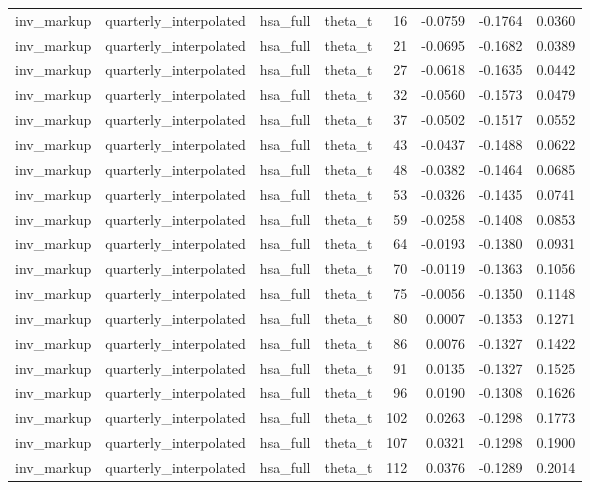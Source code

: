 \begin{tabular}{llllrrrr}
inv\_markup & quarterly\_interpolated & hsa\_full & theta\_t & 16 & -0.0759 & -0.1764 & 0.0360 \\
inv\_markup & quarterly\_interpolated & hsa\_full & theta\_t & 21 & -0.0695 & -0.1682 & 0.0389 \\
inv\_markup & quarterly\_interpolated & hsa\_full & theta\_t & 27 & -0.0618 & -0.1635 & 0.0442 \\
inv\_markup & quarterly\_interpolated & hsa\_full & theta\_t & 32 & -0.0560 & -0.1573 & 0.0479 \\
inv\_markup & quarterly\_interpolated & hsa\_full & theta\_t & 37 & -0.0502 & -0.1517 & 0.0552 \\
inv\_markup & quarterly\_interpolated & hsa\_full & theta\_t & 43 & -0.0437 & -0.1488 & 0.0622 \\
inv\_markup & quarterly\_interpolated & hsa\_full & theta\_t & 48 & -0.0382 & -0.1464 & 0.0685 \\
inv\_markup & quarterly\_interpolated & hsa\_full & theta\_t & 53 & -0.0326 & -0.1435 & 0.0741 \\
inv\_markup & quarterly\_interpolated & hsa\_full & theta\_t & 59 & -0.0258 & -0.1408 & 0.0853 \\
inv\_markup & quarterly\_interpolated & hsa\_full & theta\_t & 64 & -0.0193 & -0.1380 & 0.0931 \\
inv\_markup & quarterly\_interpolated & hsa\_full & theta\_t & 70 & -0.0119 & -0.1363 & 0.1056 \\
inv\_markup & quarterly\_interpolated & hsa\_full & theta\_t & 75 & -0.0056 & -0.1350 & 0.1148 \\
inv\_markup & quarterly\_interpolated & hsa\_full & theta\_t & 80 & 0.0007 & -0.1353 & 0.1271 \\
inv\_markup & quarterly\_interpolated & hsa\_full & theta\_t & 86 & 0.0076 & -0.1327 & 0.1422 \\
inv\_markup & quarterly\_interpolated & hsa\_full & theta\_t & 91 & 0.0135 & -0.1327 & 0.1525 \\
inv\_markup & quarterly\_interpolated & hsa\_full & theta\_t & 96 & 0.0190 & -0.1308 & 0.1626 \\
inv\_markup & quarterly\_interpolated & hsa\_full & theta\_t & 102 & 0.0263 & -0.1298 & 0.1773 \\
inv\_markup & quarterly\_interpolated & hsa\_full & theta\_t & 107 & 0.0321 & -0.1298 & 0.1900 \\
inv\_markup & quarterly\_interpolated & hsa\_full & theta\_t & 112 & 0.0376 & -0.1289 & 0.2014 \\

\end{tabular}
